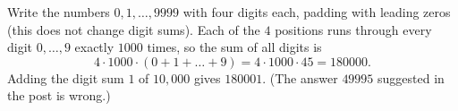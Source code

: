 Write the numbers $0,1,\dots,9999$ with four digits each, padding with leading zeros (this does not change digit sums). Each of the $4$ positions runs through every digit $0,\dots,9$ exactly $1000$ times, so the sum of all digits is
\[
4\cdot1000\cdot(0+1+\dots+9)=4\cdot1000\cdot45=180000 .
\]
Adding the digit sum $1$ of $10{,}000$ gives $\boxed{180001}$. (The answer $49995$ suggested in the post is wrong.)
